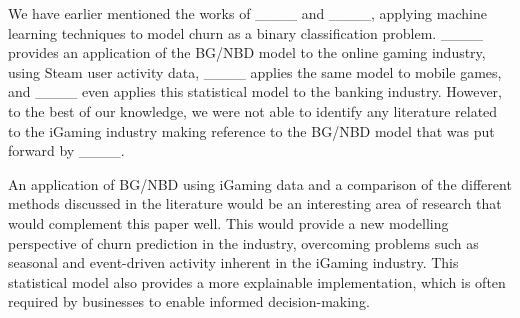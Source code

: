 We have earlier mentioned the works of ____ and ____, applying machine learning techniques to model churn as a binary classification problem. ____ provides an application of the BG/NBD model to the online gaming industry, using Steam user activity data, ____ applies the same model to mobile games, and ____ even applies this statistical model to the banking industry. However, to the best of our knowledge, we were not able to identify any literature related to the iGaming industry making reference to the BG/NBD model that was put forward by ____. 

An application of BG/NBD using iGaming data and a comparison of the different methods discussed in the literature would be an interesting area of research that would complement this paper well. This would provide a new modelling perspective of churn prediction in the industry, overcoming problems such as seasonal and event-driven activity inherent in the iGaming industry. This statistical model also provides a more explainable implementation, which is often required by businesses to enable informed decision-making.